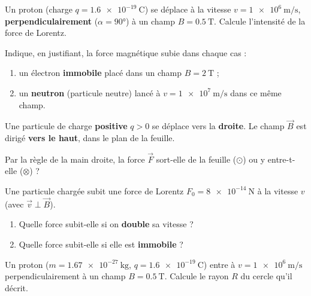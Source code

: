 \documentclass[11pt,a4paper]{article}
\newcommand{\vv}[1]{\vec{#1}}\newcommand{\ds}{\displaystyle}
\begin{document}
\begin{exo}
Un proton (charge $q=\qty{1.6e-19}{\coulomb}$) se déplace à la vitesse $v=\qty{1e6}{\metre\per\second}$,
\textbf{perpendiculairement} ($\alpha=\ang{90}$) à un champ $B=\qty{0.5}{\tesla}$. Calcule
l'intensité de la force de Lorentz.
\end{exo}

\begin{exo}
Indique, en justifiant, la force magnétique subie dans chaque cas :
\begin{enumerate}[label=\alph*)]
  \item un électron \textbf{immobile} placé dans un champ $B=\qty{2}{\tesla}$ ;
  \item un \textbf{neutron} (particule neutre) lancé à $v=\qty{1e7}{\metre\per\second}$ dans ce même champ.
\end{enumerate}
\end{exo}

\begin{exo}
Une particule de charge \textbf{positive} $q>0$ se déplace vers la \textbf{droite}. Le champ $\vv{B}$
est dirigé \textbf{vers le haut}, dans le plan de la feuille.
\begin{center}
\end{center}
Par la règle de la main droite, la force $\vv{F}$ sort-elle de la feuille ($\odot$) ou y entre-t-elle
($\otimes$) ?
\end{exo}

\begin{exo}
Une particule chargée subit une force de Lorentz $F_0=\qty{8e-14}{\newton}$ à la vitesse $v$
(avec $\vv{v}\perp\vv{B}$).
\begin{enumerate}[label=\alph*)]
  \item Quelle force subit-elle si on \textbf{double} sa vitesse ?
  \item Quelle force subit-elle si elle est \textbf{immobile} ?
\end{enumerate}
\end{exo}

\begin{exo}
Un proton ($m=\qty{1.67e-27}{\kilogram}$, $q=\qty{1.6e-19}{\coulomb}$) entre à
$v=\qty{1e6}{\metre\per\second}$ perpendiculairement à un champ $B=\qty{0.5}{\tesla}$. Calcule le
rayon $R$ du cercle qu'il décrit.
\end{exo}
\end{document}
